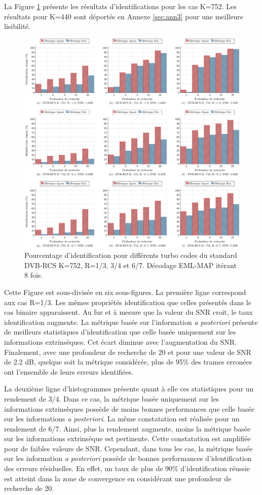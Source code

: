 La Figure \ref{fig:dvb752} présente les résultats d'identifications pour les cas K=752. Les résultats pour K=440 sont 
déportés en Annexe \ref{sec:ann3} pour une meilleure lisibilité.
\begin{figure}[!h]
	\centering
	\hspace*{-1cm}
	\includegraphics[width=1.05\textwidth]{main/ch3_fig/id2/dvb/tikz/752.pdf}
	\caption{Pourcentage d'identification pour différents turbo codes du standard DVB-RCS K=752, R=1/3, 3/4 et 6/7.
	Décodage EML-MAP itérant 8 fois. \label{fig:dvb752}}
\end{figure}
Cette Figure est sous-divisée en six sous-figures. La première ligne correspond aux cas R=1/3. Les mêmes propriétés 
identification que celles présentés dans le cas binaire apparaissent. Au fur et à mesure que la valeur du SNR croit, le 
taux identification augmente. La métrique basée sur l'information \textit{a posteriori} présente de meilleurs statistiques
d'identification que celle basée uniquement sur les informations extrinsèques. Cet écart diminue avec l'augmentation du SNR.
Finalement, avec une profondeur de recherche de 20 et pour une valeur de SNR de 2.2 dB, quelque soit la métrique considérée, 
plus de 95\% des trames erronées ont l'ensemble de leurs erreurs identifiées.

La deuxième ligne d'histogrammes présente quant à elle ces statistiques  pour un rendement de 3/4. Dans ce cas, la 
métrique basée uniquement sur les informations extrinsèques possède de moins bonnes performances que celle basée sur les 
informations \textit{a posteriori}. La même constatation est réalisée pour un rendement de 6/7. Ainsi, plus la rendement 
augmente, moins la métrique basée sur les informations extrinsèque est pertinente. Cette constatation est amplifiée pour 
de faibles valeurs de SNR. Cependant, dans tous les cas, la métrique basée sur les information \textit{a posteriori} 
possède de bonnes performances d'identification des erreurs résiduelles. En effet, un taux de plus de 90\% d'identification 
réussie est atteint dans la zone de convergence en considérant une profondeur de recherche de 20. 

